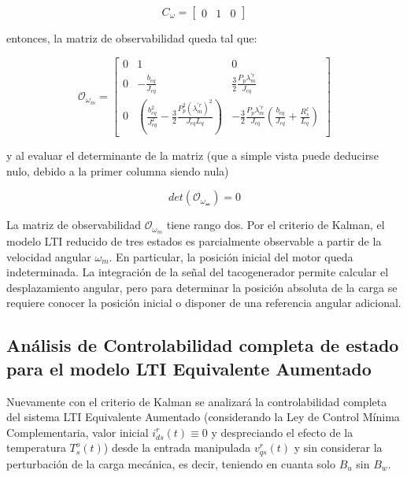 \documentclass[blue,fullpaper]{ludusofficial}  %
\begin{document}
\[
C_\omega =\begin{bmatrix} 0&1&0 \end{bmatrix}
\]

entonces, la matriz de observabilidad queda tal que:

\begin{equation}
\label{eq:observabilidad-velocidad}
    \mathcal{O}_{\omega_m} = \begin{bmatrix}
0 & 1 & 0 \\
0 & -\frac{b_{eq}}{J_{eq}} & \frac{3}{2}\frac{P_p\lambda_{m}^{'r}}{J_{eq}} \\
0 & \left( \frac{b_{eq}^2}{J_{eq}^2} - \frac{3}{2}\frac{P_p^2 (\lambda_{m}^{'r})^2}{J_{eq}L_q} \right) & -\frac{3}{2}\frac{P_p\lambda_{m}^{'r}}{J_{eq}} \left( \frac{b_{eq}}{J_{eq}} + \frac{R^\ell_s}{L_q} \right)
\end{bmatrix}
\end{equation}

y al evaluar el determinante de la matriz (que a simple vista puede deducirse nulo, debido a la primer columna siendo nula)

\[
det(\mathcal{O_{\omega_m}})=0
\]

La matriz de observabilidad $\mathcal{O}_{\omega_m}$ tiene rango dos.
Por el criterio de Kalman, el modelo LTI reducido de tres estados
es parcialmente observable a partir de la velocidad angular
$\omega_m$. En particular, la posición inicial del motor queda
indeterminada. La integración de la señal del tacogenerador
permite calcular el desplazamiento angular, pero para determinar
la posición absoluta de la carga se requiere conocer la posición
inicial o disponer de una referencia angular adicional.

\subsection{Análisis de Controlabilidad completa de estado para el modelo LTI Equivalente Aumentado}

Nuevamente con el criterio de Kalman se analizará la controlabilidad completa del sistema LTI Equivalente Aumentado (considerando la Ley de Control Mínima Complementaria, valor inicial  $i_{ds}^{r}(t) \equiv 0$ y despreciando el efecto de la temperatura $T_{s}^{o}(t)$) desde la entrada manipulada $v_{qs}^r(t)$ y sin considerar la perturbación de la carga mecánica, es decir, teniendo en cuanta solo $B_u$ sin $B_w$. 
\end{document}
